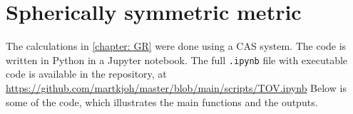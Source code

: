  

\section{Spherically symmetric metric}
The calculations in \autoref{chapter: GR} were done using a CAS system.
The code is written in Python in a Jupyter notebook.
The full \texttt{.ipynb} file with executable code is available in the repository, at \url{https://github.com/martkjoh/master/blob/main/scripts/TOV.ipynb}
Below is some of the code, which illustrates the main functions and the outputs.



